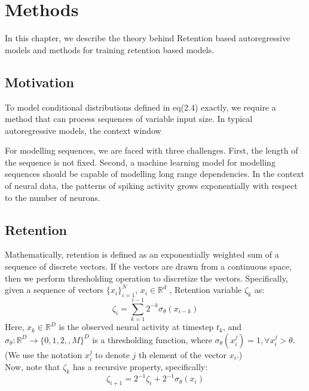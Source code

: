 \chapter{Methods}\label{ch:methods}
In this chapter, we describe the theory behind Retention based autoregressive models and methods for training retention based models. 
\section{Motivation}

To model conditional distributions defined in eq(2.4) exactly, we require a method that can process sequences of variable input size. In typical autoregressive models, the context window


For modelling sequences, we are faced with three challenges. First, the length of the sequence is not fixed. Second, a machine learning model for modelling sequences should be capable of modelling long range dependencies. In the context of neural data, the patterns of spiking activity grows exponentially with respect to the number of neurons. 
\section{Retention}
Mathematically, retention is defined as an exponentially weighted sum of a sequence of discrete vectors. If the vectors are drawn from a continuous space, then we perform thresholding operation to discretize the vectors. 
Specifically, given a sequence of vectors $\{x_i\}_{i=1}^N$, $x_i \in \mathbb{R}^d$ , Retention variable $ \zeta_k $ as:
\begin{equation}
    \zeta_i = \sum_{k=1}^{i-1} 2^{-k} \sigma_{\theta}(x_{i-k}) 
\end{equation}
Here, $x_k \in \mathbb{R}^D$ is the observed neural activity at timestep $t_k$, and $\sigma_{\theta}: \mathbb{R}^D \rightarrow \{0,1,2,,M\}^D $ is a thresholding function, where $\sigma_{\theta}(x_i^{j}) = 1, \forall x_i^{j} > \theta $. (We use the notation $x_i^{j}$ to denote $j$ th element of the vector $x_i$.)
\\

Now, note that $\zeta_k $ has a recursive property, specifically:
\begin{equation}
    \zeta_{i+1} = 2^{-1}\zeta_i +  2^{-1}\sigma_{\theta}(x_i)
\end{equation}
